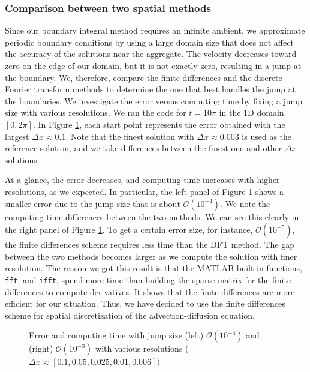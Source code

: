 \subsubsection{Comparison between two spatial methods}
Since our boundary integral method requires an infinite ambient, we approximate periodic boundary conditions by using a large domain size that does not affect the accuracy of the solutions near the aggregate. The velocity decreases toward zero on the edge of our domain,
but it is not exactly zero, resulting in a jump at the boundary.
We, therefore, compare the finite differences and the discrete Fourier transform methods to determine the one that best handles the jump at the boundaries. We investigate the error versus computing time by fixing a jump size with various resolutions. We ran the code for $t = 10 \pi$ in the 1D domain $[0, 2\pi].$ In Figure \ref{fig_precision}, each start point represents the error obtained with the largest $\Delta x \approx 0.1$. Note that the finest solution with $\Delta x \approx 0.003$ is used as the reference solution, and we take differences between the finest one and other $\Delta x$ solutions.  
\par
At a glance, the error decreases, and computing time increases with higher resolutions, as we expected. In particular, the left panel of Figure \ref{fig_precision} shows a smaller error due to the jump size that is about $\mathcal{O}(10^{-4})$.
We note the computing time differences between the two methods. We can see this clearly in the right panel of Figure \ref{fig_precision}. To get a certain error size, for instance, $\mathcal{O}(10^{-5})$, the finite differences scheme requires less time than the DFT method. The gap between the two methods becomes larger as we compute the solution with finer resolution.  
The reason we got this result is that the MATLAB built-in functions, \verb+fft+, and \verb+ifft+, spend more time than building the sparse matrix for the finite differences to compute derivatives. It shows that the finite differences are more efficient for our situation. 
Thus, we have decided to use the finite differences scheme for spatial discretization of the advection-diffusion equation.
\begin{figure}[ht]
	\begin{center}
	\end{center}
	\caption{Error and computing time with jump size (left) $\mathcal{O}(10^{-4})$ and (right) $\mathcal{O}(10^{-3})$ with various resolutions ($\Delta x \approx [0.1, 0.05, 0.025, 0.01, 0.006])$}
	\label{fig_precision}
\end{figure}

